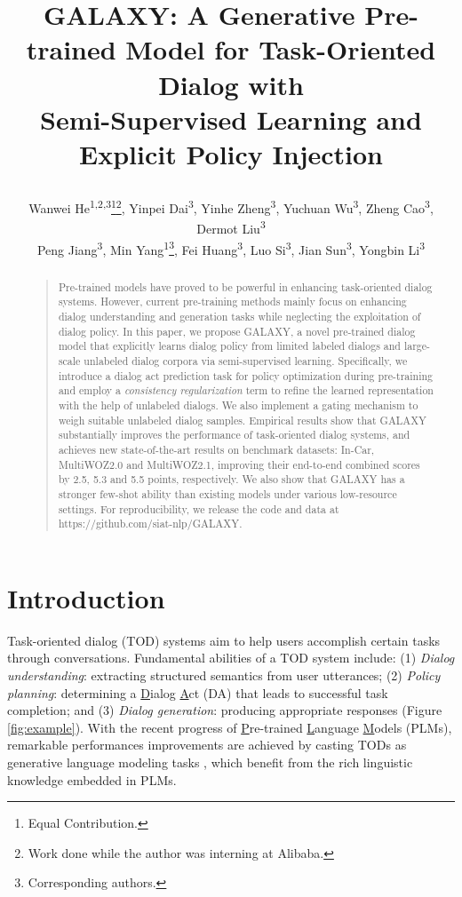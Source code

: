 \documentclass[letterpaper]{article} \usepackage{aaai22}  \usepackage{times}  \usepackage{helvet}  \usepackage{courier}  \usepackage[hyphens]{url}  \usepackage{graphicx} \urlstyle{rm} \def\UrlFont{\rm}  \usepackage{natbib}  \usepackage{caption} \DeclareCaptionStyle{ruled}{labelfont=normalfont,labelsep=colon,strut=off} \frenchspacing  \setlength{\pdfpagewidth}{8.5in}  \setlength{\pdfpageheight}{11in}  \usepackage{algorithm}
\title{


GALAXY: A Generative Pre-trained Model for Task-Oriented Dialog with \\  Semi-Supervised Learning and Explicit Policy Injection
}
\author{Wanwei He\textsuperscript{1,2,3}\thanks{Equal Contribution.}\thanks{Work done while the author was interning at Alibaba.}, Yinpei Dai\textsuperscript{3}\footnotemark[1], Yinhe Zheng\textsuperscript{3}, Yuchuan Wu\textsuperscript{3}, Zheng Cao\textsuperscript{3}, Dermot Liu\textsuperscript{3} \\Peng Jiang\textsuperscript{3}, Min Yang\textsuperscript{1}\thanks{Corresponding authors.}, Fei Huang\textsuperscript{3}, Luo Si\textsuperscript{3}, Jian Sun\textsuperscript{3}, Yongbin Li\textsuperscript{3}\footnotemark[3]}
\begin{document}
\maketitle
\begin{abstract}
\begin{quote}
Pre-trained models have proved to be powerful in enhancing task-oriented dialog systems. 
However, current pre-training methods mainly focus on enhancing dialog understanding and generation tasks while neglecting the exploitation of dialog policy.
In this paper, we propose GALAXY, a novel pre-trained dialog model that explicitly learns dialog policy from limited labeled dialogs and large-scale unlabeled dialog corpora via semi-supervised learning.
Specifically, we introduce a dialog act prediction task for policy optimization 
during pre-training and employ a \textit{consistency regularization} term to refine the learned representation with the help of unlabeled dialogs.
We also implement a gating mechanism to weigh suitable unlabeled dialog samples.
Empirical results show that GALAXY substantially improves the performance of task-oriented dialog systems, and achieves new state-of-the-art results on benchmark datasets: In-Car, MultiWOZ2.0  and  MultiWOZ2.1,  improving their end-to-end combined scores by 2.5, 5.3 and 5.5 points, respectively.
We also show that GALAXY has a stronger few-shot ability than existing models under various low-resource settings. 
For reproducibility, we release the code and data at \UrlFont{https://github.com/siat-nlp/GALAXY}.
\end{quote}
\end{abstract}


\section{Introduction}
Task-oriented dialog (TOD) systems aim to help users accomplish certain tasks through conversations. Fundamental abilities of a TOD system include: (1) \textit{Dialog understanding}: extracting structured semantics from user utterances; (2) \textit{Policy planning}: determining a \underline{D}ialog \underline{A}ct (DA) that leads to successful task completion; and (3) \textit{Dialog generation}: producing appropriate responses (Figure \ref{fig:example}).
With the recent progress of \underline{P}re-trained \underline{L}anguage \underline{M}odels (PLMs), remarkable performances improvements are achieved by casting TODs as generative language modeling tasks \cite{peng2020soloist, lin2020mintl}, which benefit from the rich linguistic knowledge embedded in PLMs.
\end{document}
